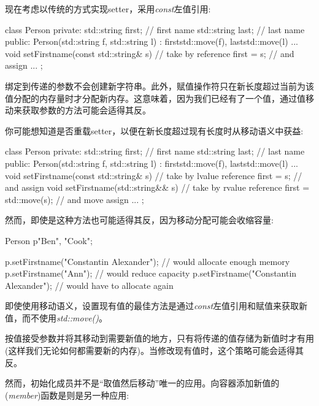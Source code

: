 现在考虑以传统的方式实现setter，采用\textit{const}左值引用:

\begin{cppcode}
class Person {
private:
	std::string first; // first name
	std::string last; // last name
public:
	Person(std::string f, std::string l)
	: first{std::move(f)}, last{std::move(l)} {
	}
	...
	void setFirstname(const std::string& s) { // take by reference
		first = s; // and assign
	}
	...
};
\end{cppcode}

绑定到传递的参数不会创建新字符串。此外，赋值操作符只在新长度超过当前为该值分配的内存量时才分配新内存。这意味着，因为我们已经有了一个值，通过值移动来获取参数的方法可能会适得其反。

你可能想知道是否重载setter，以便在新长度超过现有长度时从移动语义中获益:

\begin{cppcode}
class Person {
private:
	std::string first; // first name
	std::string last; // last name
public:
	Person(std::string f, std::string l)
	: first{std::move(f)}, last{std::move(l)} {
	}
	...
	void setFirstname(const std::string& s) { // take by lvalue reference
		first = s; // and assign
	}
	void setFirstname(std::string&& s) { // take by rvalue reference
		first = std::move(s); // and move assign
	}
	...
};
\end{cppcode}

然而，即使是这种方法也可能适得其反，因为移动分配可能会收缩容量:

\begin{cppcode}
Person p{"Ben", "Cook"};

p.setFirstname("Constantin Alexander"); // would allocate enough memory
p.setFirstname("Ann"); // would reduce capacity
p.setFirstname("Constantin Alexander"); // would have to allocate again
\end{cppcode}

即使使用移动语义，设置现有值的最佳方法是通过\textit{const}左值引用和赋值来获取新值，而不使用\textit{std::move()}。

按值接受参数并将其移动到需要新值的地方，只有将传递的值存储为新值时才有用(这样我们无论如何都需要新的内存)。当修改现有值时，这个策略可能会适得其反。

然而，初始化成员并不是“取值然后移动”唯一的应用。向容器添加新值的(\textit{member})函数是则是另一种应用:

